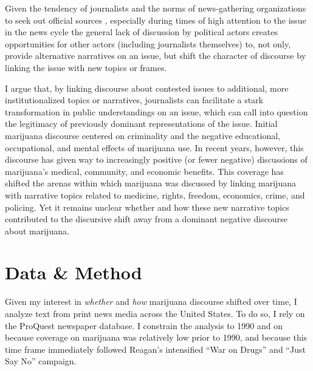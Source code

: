 Given the tendency of journalists and the norms of news-gathering organizations to seek out official sources \citep{schudson_2002,gitlin_1980,gans_1979}, especially during times of high attention to the issue in the news cycle \citep{baumgartner_and_jones_1993} the general lack of discussion by political actors creates opportunities for other actors (including journalists themselves) to, not only, provide alternative narratives on an issue, but shift the character of discourse by linking the issue with new topics or frames. 



I argue that, by linking discourse about contested issues to additional, more institutionalized topics or narratives, journalists can facilitate a stark transformation in public understandings on an issue, which can call into question the legitimacy of previously dominant representations of the issue. Initial marijuana discourse centered on criminality and the negative educational, occupational, and mental effects of marijuana use. In recent years, however, this discourse has given way to increasingly positive (or fewer negative) discussions of marijuana's medical, community, and economic benefits. This coverage has shifted the arenas within which marijuana was discussed by linking marijuana with narrative topics related to medicine, rights, freedom, economics, crime, and policing. Yet it remains unclear whether and how these new narrative topics contributed to the discursive shift away from a dominant negative discourse about marijuana. 




\section{Data \& Method}

Given my interest in \textit{whether} and \textit{how} marijuana discourse shifted over time, I analyze text from print news media across the United States. To do so, I rely on the ProQuest newspaper database. I constrain the analysis to 1990 and on because coverage on marijuana was relatively low prior to 1990, and because this time frame immediately followed Reagan's intensified ``War on Drugs'' and ``Just Say No'' campaign. 

